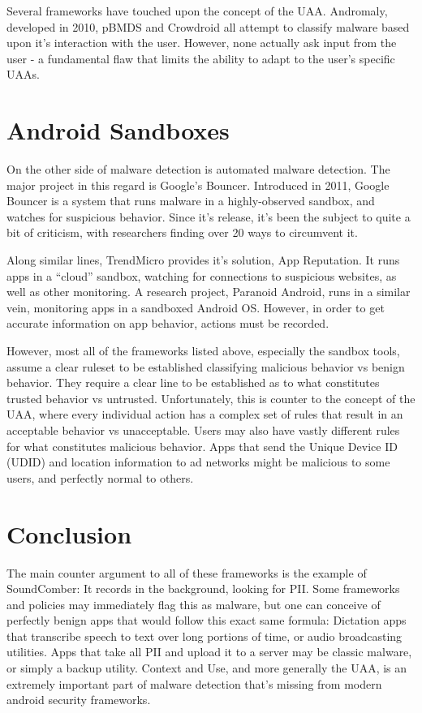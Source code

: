 Several frameworks have touched upon the concept of the UAA. Andromaly\citep{shabtai2012andromaly}, developed in 2010, pBMDS\citep{xie2010pbmds} and Crowdroid\citep{burguera2011crowdroid} all attempt to classify malware based upon it's interaction with the user. However, none actually ask input from the user - a fundamental flaw that limits the ability to adapt to the user's specific UAAs.

\section{Android Sandboxes}
On the other side of malware detection is automated malware detection. The major project in this regard is Google's Bouncer\citep{googlebouncer}. Introduced in 2011, Google Bouncer is a system that runs malware in a highly-observed sandbox, and watches for suspicious behavior. Since it's release, it's been the subject to quite a bit of criticism\citep{mansfield2012android}, with researchers finding over 20 ways to circumvent it.

Along similar lines, TrendMicro provides it's solution, App Reputation\citep{trendmicroappreputation}. It runs apps in a ``cloud'' sandbox, watching for connections to suspicious websites, as well as other monitoring. A research project, Paranoid Android\citep{portokalidis2010paranoid}, runs in a similar vein, monitoring apps in a sandboxed Android OS. However, in order to get accurate information on app behavior, actions must be recorded.

However, most all of the frameworks listed above, especially the sandbox tools, assume a clear ruleset to be established classifying malicious behavior vs benign behavior. They require a clear line to be established as to what constitutes trusted behavior vs untrusted. Unfortunately, this is counter to the concept of the UAA, where every individual action has a complex set of rules that result in an acceptable behavior vs unacceptable. Users may also have vastly different rules for what constitutes malicious behavior. Apps that send the Unique Device ID (UDID) and location information to ad networks might be malicious to some users, and perfectly normal to others.


\section{Conclusion}
The main counter argument to all of these frameworks is the example of SoundComber: It records in the background, looking for PII. Some frameworks and policies may immediately flag this as malware, but one can conceive of perfectly benign apps that would follow this exact same formula: Dictation apps that transcribe speech to text over long portions of time, or audio broadcasting utilities. Apps that take all PII and upload it to a server may be classic malware, or simply a backup utility. Context and Use, and more generally the UAA, is an extremely important part of malware detection that's missing from modern android security frameworks.
